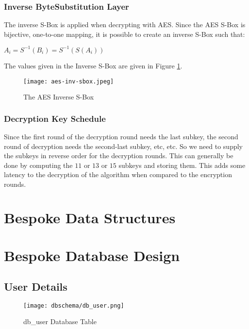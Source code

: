\subsubsection{Inverse ByteSubstitution Layer}

The inverse S-Box is applied when decrypting with AES. Since the AES S-Box is bijective, one-to-one mapping, it is possible to create an inverse S-Box such that:

\begin{center}
$A_i = S^{-1}(B_i) = S^{-1}(S(A_i))$
\end{center}

The values given in the Inverse S-Box are given in Figure \ref{AES-InvS-BOX}.

\begin{figure}[H]
\begin{center}
\texttt{[image: aes-inv-sbox.jpeg]}
\end{center}
\caption{The AES Inverse S-Box}
\label{AES-InvS-BOX}
\end{figure}

\subsubsection{Decryption Key Schedule}

Since the first round of the decryption round needs the last subkey, the second round of decryption needs the second-last subkey, etc, etc. So we need to supply the subkeys in reverse order for the decryption rounds. This can generally be done by computing the $11$ or $13$ or $15$ subkeys and storing them. This adds some latency to the decryption of the algorithm when compared to the encryption rounds. 


\section{Bespoke Data Structures}

\newpage
\section{Bespoke Database Design}

\subsection{User Details}

\begin{figure}[H]
\begin{center}
\texttt{[image: dbschema/db\_user.png]}
\end{center}
\caption{ db\_user Database Table}
\label{db_user_table}
\end{figure}

